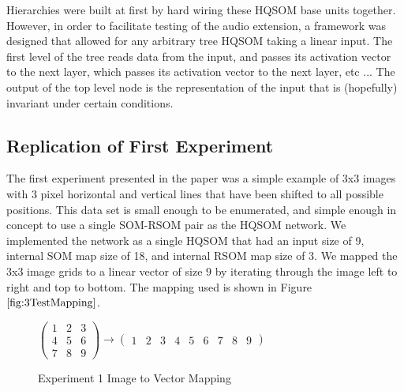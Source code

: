 \documentclass[a4paper,10pt]{article}
\begin{document}
Hierarchies were built at first by hard wiring these HQSOM base units together.  However, in order
to facilitate testing of the audio extension, a framework was designed that allowed for any
arbitrary tree HQSOM taking a linear input.  The first level of the tree reads data from the input,
and passes its activation vector to the next layer, which passes its activation vector to the next
layer, etc ...  The output of the top level node is the representation of the input that is
(hopefully) invariant under certain conditions.

\subsection{Replication of First Experiment}
The first experiment presented in the paper was a simple example of 3x3 images with 3
pixel horizontal and vertical lines that have been shifted to all possible positions.  This data
set is small enough to be enumerated, and simple enough in concept to use a single SOM-RSOM pair as
the HQSOM network.  We implemented the network as a single HQSOM that had an input size of 9,
internal SOM map size of 18, and internal RSOM map size of 3.  We mapped the 3x3 image grids
to a linear vector of size 9 by iterating through the image left to right and top to bottom.
The mapping used is shown in Figure $\ref{fig:3TestMapping}$.
\begin{figure}[ht]
\begin{center} 
$\begin{pmatrix}
1 & 2 & 3 \\
4 & 5 & 6 \\
7 & 8 & 9 
\end{pmatrix}
\rightarrow
\begin{pmatrix}
1 & 2 & 3 & 4 & 5 & 6 & 7 & 8 & 9 
\end{pmatrix}
$
\end{center} 
\caption{Experiment 1 Image to Vector Mapping}
\label{fig:3TestMapping}
\end{figure} 
\end{document}
